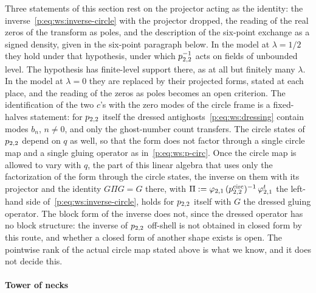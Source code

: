 Three statements of this section rest on the projector acting as the identity: the inverse~\eqref{p:eq:ws:inverse-circle} with the projector dropped, the reading of the real zeros of the transform as poles, and the description of the six-point exchange as a signed density, given in the six-point paragraph below.
In the model at $\lambda = 1 / 2$ they hold under that hypothesis, under which $p_{2,2}^{-1}$ acts on fields of unbounded level.
The hypothesis has finite-level support there, as at all but finitely many $\lambda$.
In the model at $\lambda = 0$ they are replaced by their projected forms, stated at each place, and the reading of the zeros as poles becomes an open criterion.
The identification of the two $c$'s with the zero modes of the circle frame is a fixed-halves statement: for $p_{2,2}$ itself the dressed antighosts~\eqref{p:eq:ws:dressing} contain modes $b_n$, $n \neq 0$, and only the ghost-number count transfers.
The circle states of $p_{2,2}$ depend on $q$ as well, so that the form does not factor through a single circle map and a single gluing operator as in~\eqref{p:eq:ws:p-circ}.
Once the circle map is allowed to vary with $q$, the part of this linear algebra that uses only the factorization of the form through the circle states, the inverse on them with its projector and the identity $G \Pi G = G$ there, with $\Pi := \varphi_{2,1} \, (p_{2,2}^{\mathrm{circ}})^{-1} \, {\varphi_{2,1}^t}$ the left-hand side of~\eqref{p:eq:ws:inverse-circle}, holds for $p_{2,2}$ itself with $G$ the dressed gluing operator.
The block form of the inverse does not, since the dressed operator has no block structure: the inverse of $p_{2,2}$ off-shell is not obtained in closed form by this route, and whether a closed form of another shape exists is open.
The pointwise rank of the actual circle map stated above is what we know, and it does not decide this.

\paragraph{Tower of necks}
\label{p:sec:ws:necks}



